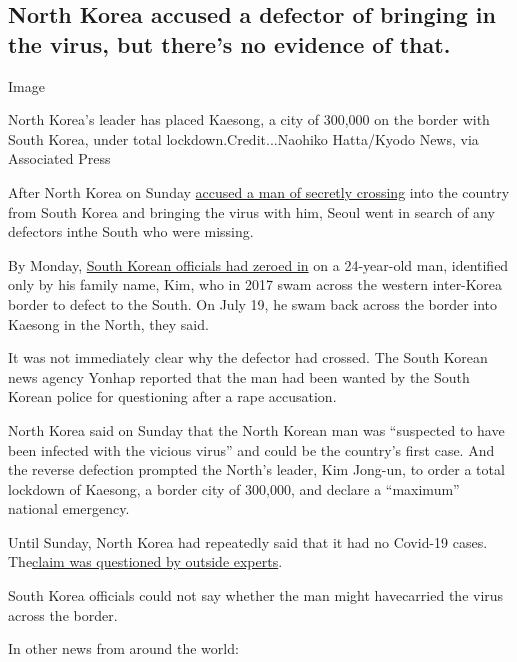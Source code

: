 \hypertarget{north-korea-accused-a-defector-of-bringing-in-the-virus-but-theres-no-evidence-of-that}{%
\subsection{North Korea accused a defector of bringing in the virus, but
there's no evidence of
that.}\label{north-korea-accused-a-defector-of-bringing-in-the-virus-but-theres-no-evidence-of-that}}

Image

North Korea's leader has placed Kaesong, a city of 300,000 on the border
with South Korea, under total lockdown.Credit...Naohiko Hatta/Kyodo
News, via Associated Press

After North Korea on Sunday
\href{https://www.nytimes.com/2020/07/25/world/asia/north-korea-coronavirus-kim-jong-un.html}{accused
a man of secretly crossing} into the country from South Korea and
bringing the virus with him, Seoul went in search of any defectors ​in
​the South who were missing.

By Monday,
\href{https://www.nytimes.com/2020/07/27/world/asia/north-korea-defector-coronavirus.html}{South
Korean officials had zeroed in} on a 24-year-old man, identified only by
his family name, Kim, who in 2017 swam across the western inter-Korea
border to defect to the South. On July 19, he swam back across the
border into Kaesong in the North, they said.

It was not immediately clear why the defector had crossed. The South
Korean news agency Yonhap reported that the man had been wanted by the
South Korean police for questioning after a rape accusation.

North Korea said on Sunday that the North Korean man was ``suspected to
have been infected with the vicious virus'' and could be the country's
first case. And the reverse defection prompted the North's leader, Kim
Jong-un, to order a total lockdown of Kaesong, a border city of 300,000,
and declare a ``maximum'' national emergency.

Until Sunday, North Korea had ​repeatedly ​said that it had no Covid-19
cases.
The\href{https://www.nytimes.com/2020/03/31/world/asia/north-korea-coronavirus.html?action=click\&module=RelatedLinks\&pgtype=Article}{claim
was questioned by outside experts}.

South Korea officials could not say whether the man might have ​carried
the virus across the border.

In other news from around the world:

